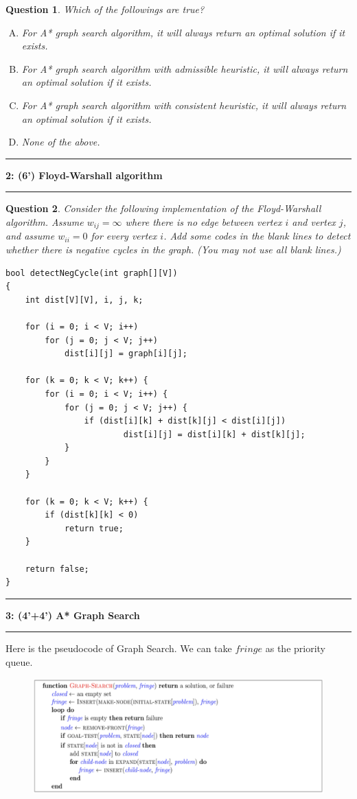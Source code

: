 \documentclass[10.5pt]{article}
\newcommand\question[2]{\vspace{.25in}\hrule\textbf{#1: #2}\vspace{.5em}\hrule\vspace{.10in}}
\newtheorem{Q}{Question}
\begin{document}
\begin{Q}
	Which of the followings are true?
	\begin{enumerate}[(A)]
		\item For A* graph search algorithm, it will always return an optimal solution if it exists.
		\item For A* graph search algorithm with admissible heuristic, it will always return an optimal solution if it exists.
		\item For A* graph search algorithm with consistent heuristic, it will always return an optimal solution if it exists.
		\item None of the above.
	\end{enumerate}
\end{Q}

\question{2}{(6') Floyd-Warshall algorithm}
\begin{Q}
	Consider the following implementation of the Floyd-Warshall algorithm. Assume $w_{ij}=\infty$ where there is no edge between vertex $i$ and vertex $j$, and assume $w_{ii}=0$ for every vertex $i$. Add some codes in the blank lines to detect whether there is negative cycles in the graph. (You may not use all blank lines.)
	\lstset{language=C++}
	\begin{lstlisting}    
bool detectNegCycle(int graph[][V]) 
{ 
    int dist[V][V], i, j, k; 
   
    for (i = 0; i < V; i++) 
        for (j = 0; j < V; j++) 
            dist[i][j] = graph[i][j]; 
   
    for (k = 0; k < V; k++) { 
        for (i = 0; i < V; i++) { 
            for (j = 0; j < V; j++) { 
                if (dist[i][k] + dist[k][j] < dist[i][j]) 
                        dist[i][j] = dist[i][k] + dist[k][j]; 
            } 
        } 
    } 
    
    for (k = 0; k < V; k++) {
        if (dist[k][k] < 0)
            return true;
    }
            
    return false;  
} 

\end{lstlisting}

\end{Q}


\newpage
\question{3}{(4'+4') A* Graph Search}
Here is the pseudocode of Graph Search. We can take $fringe$ as the priority queue.
\begin{figure}[htbp]
	\centerline{\includegraphics[scale=0.20]{graph-search.png}}
	\label{fig1}
\end{figure}
\end{document}
